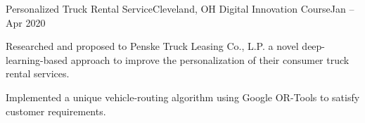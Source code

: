 \begin{ritemize}
{Personalized Truck Rental Service}{Cleveland, OH}
{Digital Innovation Course}{Jan -- Apr 2020}
	\item Researched and proposed to Penske Truck Leasing Co., L.P. a novel deep-learning-based approach to improve the personalization of their consumer truck rental services.
	\item Implemented a unique vehicle-routing algorithm using Google OR-Tools to satisfy customer requirements.
\end{ritemize}